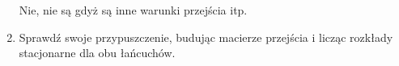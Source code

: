 \begin{enumerate}[label=\alph*)]
\begin{comment}
\path[line] (init) -- (moneta);
\path[line] (moneta) -- (or);
\path[line] (moneta) -- (re);
\path[line] (moneta) -- node [left,near start] {$\sfrac{1}{2}$} (or);
\path[line] (moneta) -- node [right,near start] {$\sfrac{1}{2}$} (re);
\path[line] (or) -- node [left,near start] {$\sfrac{1}{3}$} (or2);
\path[line] (re) -- node [right,near start] {$\sfrac{1}{3}$} (re2);
\path[draw,->,bend left,ultra thick] (re2) node [near start] {tak} (re3);
\path[line] (or2) -- node [near start] {tak} (or3);
\path[line] (re2) -- node [near start] {nie} (init);
\path[line] (or2) -- node [near start] {nie} (init);
\path[line] (or3) -- (init);
\path[line] (re3) -- (init);
\end{tikzpicture}
\end{multicols}
\end{comment}

Nie, nie są gdyż są inne warunki przejścia itp.

\item Sprawdź swoje przypuszczenie, budując macierze przejścia i licząc rozkłady stacjonarne dla obu łańcuchów.


\end{enumerate}
